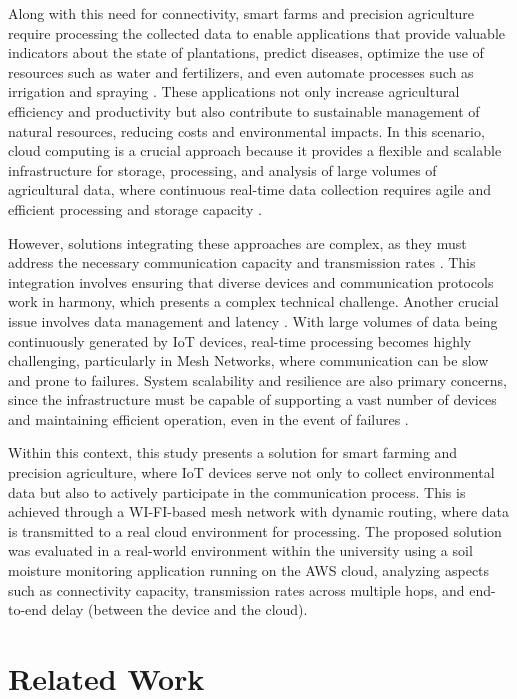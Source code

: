 \documentclass[journal]{IEEEtran}
\begin{document}
Along with this need for connectivity, smart farms and precision agriculture require processing the collected data to enable applications that provide valuable indicators about the state of plantations, predict diseases, optimize the use of resources such as water and fertilizers, and even automate processes such as irrigation and spraying \cite{karunathilake2023path}. These applications not only increase agricultural efficiency and productivity but also contribute to sustainable management of natural resources, reducing costs and environmental impacts. In this scenario, cloud computing is a crucial approach because it provides a flexible and scalable infrastructure for storage, processing, and analysis of large volumes of agricultural data, where continuous real-time data collection requires agile and efficient processing and storage capacity \cite{turukmane2023smart}.

However, solutions integrating these approaches are complex, as they must address the necessary communication capacity and transmission rates \cite{10154280,portela-noms}. This integration involves ensuring that diverse devices and communication protocols work in harmony, which presents a complex technical challenge. Another crucial issue involves data management and latency \cite{costa2021features}. With large volumes of data being continuously generated by IoT devices, real-time processing becomes highly challenging, particularly in Mesh Networks, where communication can be slow and prone to failures. System scalability and resilience are also primary concerns, since the infrastructure must be capable of supporting a vast number of devices and maintaining efficient operation, even in the event of failures \cite{Brito-LNet-2026}.

Within this context, this study presents a solution for smart farming and precision agriculture, where IoT devices serve not only to collect environmental data but also to actively participate in the communication process. This is achieved through a WI-FI-based mesh network with dynamic routing, where data is transmitted to a real cloud environment for processing. The proposed solution was evaluated in a real-world environment within the university using a soil moisture monitoring application running on the AWS cloud, analyzing aspects such as connectivity capacity, transmission rates across multiple hops, and end-to-end delay (between the device and the cloud).

\section{Related Work}
\end{document}
